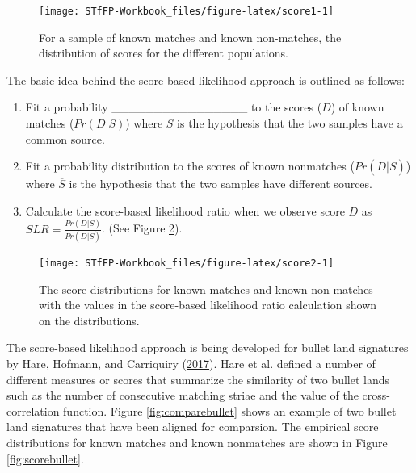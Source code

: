 \documentclass[]{book}
\providecommand{\tightlist}{%
  \setlength{\itemsep}{0pt}\setlength{\parskip}{0pt}}
\theoremstyle{definition}
\theoremstyle{definition}
\theoremstyle{remark}
\begin{document}
\begin{figure}

{\centering \texttt{[image: STfFP-Workbook\_files/figure-latex/score1-1]} 

}

\caption{For a sample of known matches and known non-matches, the distribution of scores for the different populations.}\label{fig:score1}
\end{figure}

The basic idea behind the score-based likelihood approach is outlined as
follows:

\begin{enumerate}
\def\labelenumi{\arabic{enumi}.}
\tightlist
\item
  Fit a probability \_\_\_\_\_\_\_\_\_\_\_\_\_\_\_\_ to the scores
  (\(D\)) of known matches (\(Pr(D | S)\)) where \(S\) is the hypothesis
  that the two samples have a common source. \vspace{.1in}
\item
  Fit a probability distribution to the scores of known nonmatches
  (\(Pr(D | \overline{S})\)) where \(\overline{S}\) is the hypothesis
  that the two samples have different sources. \vspace{.1in}
\item
  Calculate the score-based likelihood ratio when we observe score \(D\)
  as \(SLR = \frac{Pr(D | S)}{Pr(D | \overline{S})}\). (See Figure
  \ref{fig:score2}).
\end{enumerate}

\begin{figure}

{\centering \texttt{[image: STfFP-Workbook\_files/figure-latex/score2-1]} 

}

\caption{The score distributions for known matches and known non-matches with the values in the score-based likelihood ratio calculation shown on the distributions.}\label{fig:score2}
\end{figure}

The score-based likelihood approach is being developed for bullet land
signatures by Hare, Hofmann, and Carriquiry
(\protect\hyperlink{ref-hare}{2017}). Hare et al. defined a number of
different measures or scores that summarize the similarity of two bullet
lands such as the number of consecutive matching striae and the value of
the cross-correlation function. Figure \ref{fig:comparebullet} shows an
example of two bullet land signatures that have been aligned for
comparsion. The empirical score distributions for known matches and
known nonmatches are shown in Figure \ref{fig:scorebullet}.
\end{document}
